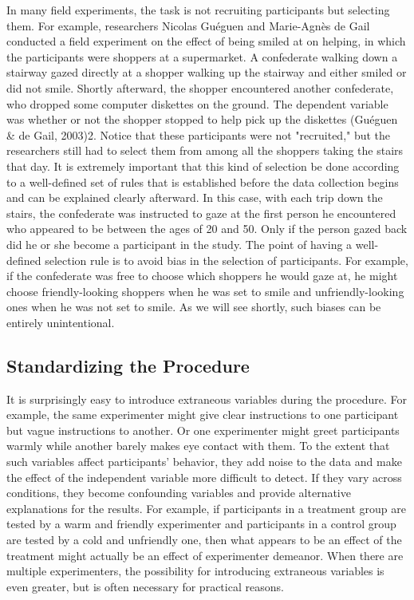 In many field experiments, the task is not recruiting participants but selecting them. For example, researchers Nicolas Guéguen and Marie-Agnès de Gail conducted a field experiment on the effect of being smiled at on helping, in which the participants were shoppers at a supermarket. A confederate walking down a stairway gazed directly at
a shopper walking up the stairway and either smiled or did not smile. Shortly afterward, the shopper encountered another confederate, who dropped some computer diskettes on the ground. The dependent variable was whether or not the shopper stopped to help pick up the diskettes (Guéguen \& de Gail, 2003)2. Notice that these participants were not "recruited," but the researchers still had to select them from among all the shoppers taking the stairs that day. It is extremely important that this kind of selection be done according to a well-defined set of rules that is established before the data collection begins and can be explained clearly afterward. In this case, with each trip down the stairs, the confederate was instructed to gaze at the first person he encountered who appeared to be between the ages of 20 and 50. Only if the person gazed back did he or she become a participant in the study. The point of having a well-defined selection rule is to avoid bias in the selection of participants. For example, if the confederate was free to choose which shoppers he would gaze at, he might choose friendly-looking shoppers when he was set to smile and unfriendly-looking ones when he was not set to smile. As we will see shortly, such biases can be entirely unintentional.

\subsection{Standardizing the Procedure}

It is surprisingly easy to introduce extraneous variables during the procedure. For example, the same experimenter might give clear instructions to one participant but vague instructions to another. Or one experimenter might greet participants warmly while another barely makes eye contact with them. To the extent that such variables affect participants' behavior, they add noise to the data and make the effect of the independent variable more difficult to detect. If they vary across conditions, they become confounding variables and provide alternative explanations for the results. For example, if participants in a treatment group are tested by a warm and friendly experimenter and participants in a control group are tested by a cold and unfriendly one, then what appears to be an effect of the treatment might actually be an effect of experimenter demeanor. When there are multiple experimenters, the possibility for introducing extraneous variables is even greater, but is often necessary for practical reasons.

